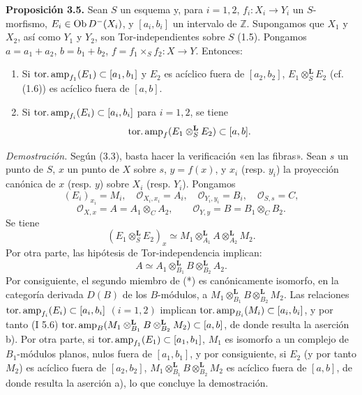 \textbf{Proposición 3.5.} Sean \(S\) un esquema y, para \(i=1,2\), \(f_i:X_i\longrightarrow Y_i\) un \(S\)-morfismo, \(E_i\in\operatorname{Ob} D^{-}(X_i)\), y \([a_i,b_i]\) un intervalo de \(\mathbb Z\). Supongamos que \(X_1\) y \(X_2\), así como \(Y_1\) y \(Y_2\), son Tor-independientes sobre \(S\) (1.5). Pongamos \(a=a_1+a_2\), \(b=b_1+b_2\), \(f=f_1\times_Sf_2:X\to Y\). Entonces:
\begin{enumerate}[label=\alph*)]
\item Si \(\operatorname{tor.amp}_{f_1}(E_1)\subset[a_1,b_1]\) y \(E_2\) es acíclico fuera de \([a_2,b_2]\), \(E_1\otimes_S^{\mathbf L}E_2\) (cf. (1.6)) es acíclico fuera de \([a,b]\).
\item Si \(\operatorname{tor.amp}_{f_i}(E_i)\subset[a_i,b_i]\) para \(i=1,2\), se tiene
\[
  \operatorname{tor.amp}_f(E_1\otimes_S^{\mathbf L}E_2)\subset[a,b].
\]
\end{enumerate}

\emph{Demostración.} Según (3.3), basta hacer la verificación «en las fibras». Sean \(s\) un punto de \(S\), \(x\) un punto de \(X\) sobre \(s\), \(y=f(x)\), y \(x_i\) (resp. \(y_i\)) la proyección canónica de \(x\) (resp. \(y\)) sobre \(X_i\) (resp. \(Y_i\)). Pongamos
\[
  (E_i)_{x_i}=M_i,\quad \mathcal O_{X_i,x_i}=A_i,\quad
  \mathcal O_{Y_i,y_i}=B_i,\quad \mathcal O_{S,s}=C,
\]
\[
  \mathcal O_{X,x}=A=A_1\otimes_C A_2,\qquad
  \mathcal O_{Y,y}=B=B_1\otimes_C B_2.
\]
Se tiene
\begin{equation}\tag{$*$}
  (E_1\otimes_S^{\mathbf L}E_2)_x
  \simeq
  M_1\otimes_{A_1}^{\mathbf L}A\otimes_{A_2}^{\mathbf L}M_2.
\end{equation}
Por otra parte, las hipótesis de Tor-independencia implican:
\[
  A\simeq A_1\otimes_{B_1}^{\mathbf L}B\otimes_{B_2}^{\mathbf L}A_2.
\]
Por consiguiente, el segundo miembro de (*) es canónicamente isomorfo, en la categoría derivada \(D(B)\) de los \(B\)-módulos, a \(M_1\otimes_{B_1}^{\mathbf L}B\otimes_{B_2}^{\mathbf L}M_2\). Las relaciones \(\operatorname{tor.amp}_{f_i}(E_i)\subset[a_i,b_i]\) \((i=1,2)\) implican \(\operatorname{tor.amp}_{B_i}(M_i)\subset[a_i,b_i]\), y por tanto (I 5.6) \(\operatorname{tor.amp}_B(M_1\otimes_{B_1}^{\mathbf L}B\otimes_{B_2}^{\mathbf L}M_2)\subset[a,b]\), de donde resulta la aserción b). Por otra parte, si \(\operatorname{tor.amp}_{f_1}(E_1)\subset[a_1,b_1]\), \(M_1\) es isomorfo a un complejo de \(B_1\)-módulos planos, nulos fuera de \([a_1,b_1]\), y por consiguiente, si \(E_2\) (y por tanto \(M_2\)) es acíclico fuera de \([a_2,b_2]\), \(M_1\otimes_{B_1}^{\mathbf L}B\otimes_{B_2}^{\mathbf L}M_2\) es acíclico fuera de \([a,b]\), de donde resulta la aserción a), lo que concluye la demostración.

